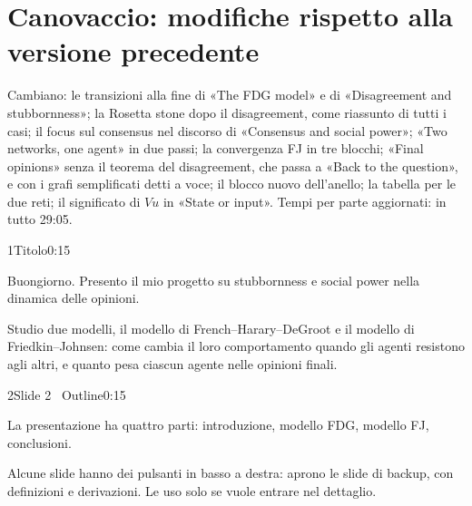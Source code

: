 \section*{Canovaccio: modifiche rispetto alla versione precedente}
Cambiano: le transizioni alla fine di «The FDG model» e di «Disagreement and stubbornness»; la Rosetta stone dopo il disagreement, come riassunto di tutti i casi; il focus sul consensus nel discorso di «Consensus and social power»; «Two networks, one agent» in due passi; la convergenza FJ in tre blocchi; «Final opinions» senza il teorema del disagreement, che passa a «Back to the question», e con i grafi semplificati detti a voce; il blocco nuovo dell'anello; la tabella per le due reti; il significato di $Vu$ in «State or input». Tempi per parte aggiornati: in tutto 29:05.
\begin{slidepag}{1}{Titolo}{0:15}
  \begin{discorso}
    \item Buongiorno. Presento il mio progetto su stubbornness e social power nella dinamica delle opinioni.
    \item Studio due modelli, il modello di French–Harary–DeGroot e il modello di Friedkin–Johnsen: come cambia il loro comportamento quando gli agenti resistono agli altri, e quanto pesa ciascun agente nelle opinioni finali.
  \end{discorso}
\end{slidepag}

\begin{slidepag}{2}{Slide 2 \textperiodcentered\ Outline}{0:15}
  \begin{discorso}
    \item La presentazione ha quattro parti: introduzione, modello FDG, modello FJ, conclusioni.
    \item Alcune slide hanno dei pulsanti in basso a destra: aprono le slide di backup, con definizioni e derivazioni. Le uso solo se vuole entrare nel dettaglio.
  \end{discorso}
\end{slidepag}

